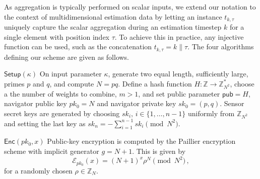 \documentclass[10pt,letterpaper,oneside,twocolumn,journal]{IEEEtran}
\theoremstyle{definition}
\theoremstyle{definition}
\theoremstyle{remark}
\begin{document}
As aggregation is typically performed on scalar inputs, we extend our notation to the context of multidimensional estimation data by letting an instance $t_{k,\tau}$ uniquely capture the scalar aggregation during an estimation timestep $k$ for a single element with position index $\tau$. To achieve this in practice, any injective function can be used, such as the concatenation $t_{k,\tau}=k\mathbin\|\tau$. The four algorithms defining our scheme are given as follows.
\begin{LaTeXdescription}
    \item[$\mathsf{Setup}(\kappa)$] On input parameter $\kappa$, generate two equal length, sufficiently large, primes $p$ and $q$, and compute $N=pq$. Define a hash function $H:\mathbb{Z} \rightarrow \mathbb{Z}_{N^2}^*$, choose a the number of weights to combine, $m>1$, and set public parameter $\mathsf{pub}=H$, navigator public key $pk_0 = N$ and navigator private key $sk_0=(p,q)$. Sensor secret keys are generated by choosing $sk_i,\,i\in\{1,\dots,n-1\}$ uniformly from $\mathbb{Z}_{N^2}$ and setting the last key as $sk_n = -\sum^{n-1}_{i=1}sk_i \pmod{N^2}$.
 
    \item[$\mathsf{Enc}(pk_0, x)$] Public-key encryption is computed by the Paillier encryption scheme with implicit generator $g=N+1$. This is given by
    \begin{equation}
        \mathcal{E}_{pk_0}(x) = (N+1)^{x}\rho^N \pmod{N^2}\,, \label{eqn:our_scheme_encrypt}
    \end{equation}
    for a randomly chosen $\rho \in \mathbb{Z}_N$.


\end{LaTeXdescription}
\end{document}
